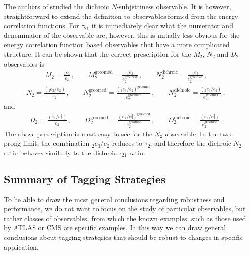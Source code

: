 \documentclass[11pt,letterpaper]{article}
\newcommand{\groomed}{\text{groomed}}
\newcommand{\ecfnobeta}[1]{e_{#1}}
\newcommand{\ecfvarnobeta}[2]{{_{#1}e_{#2}}}
\begin{document}
The authors of \cite{Salam:2016yht} studied the dichroic $N$-subjettiness observable. It is however, straightforward to extend the definition to observables formed from the energy correlation functions. For $\tau_{21}$ it is immediately clear what the numerator and denominator of the observable are, however, this is initially less obvious for the energy correlation function based observables that have a more complicated structure. It can be shown that the correct prescription for the $M_2$, $N_2$ and $D_2$ observables is
\begin{align}
M_2= \frac{ \ecfvarnobeta{1}{3}  }{\ecfnobeta{2}}\,, \qquad  M_2^{\text{groomed}}= \frac{ \ecfvarnobeta{1}{3}  }{\ecfnobeta{2}^\groomed}\,, \qquad  N_2^{\text{dichroic}}= \frac{\ecfvarnobeta{1}{3}  }{\ecfnobeta{2}^\groomed}\,, 
\end{align}
\begin{align}
N_2= \frac{\left( \ecfvarnobeta{2}{3} / \ecfnobeta{2} \right) }{\ecfnobeta{2}}\,, \qquad  N_2^{\text{groomed}}= \frac{\left( \ecfvarnobeta{2}{3} / \ecfnobeta{2} \right)^\groomed }{\ecfnobeta{2}^\groomed}\,, \qquad  N_2^{\text{dichroic}}= \frac{\left( \ecfvarnobeta{2}{3} / \ecfnobeta{2} \right) }{\ecfnobeta{2}^\groomed}\,, 
\end{align}
and
\begin{align}
D_2=\frac{\left( \ecfnobeta{3} / \ecfnobeta{2}^2 \right)}{ \ecfnobeta{2}}\,, \qquad D_2^{\text{groomed}}=\frac{\left( \ecfnobeta{3} / \ecfnobeta{2}^2 \right)^\groomed}{ \ecfnobeta{2}^\groomed}\,, \qquad D_2^{\text{dichroic}}=\frac{\left( \ecfnobeta{3} / \ecfnobeta{2}^2 \right)}{ \ecfnobeta{2}^\groomed}\,.
\end{align}
The above prescription is most easy to see for the $N_2$ observable. In the two-prong limit, the combination $ \ecfvarnobeta{2}{3} / \ecfnobeta{2} $ reduces to $\tau_2$, and therefore the dichroic $N_2$ ratio behaves similarly to the dichroic $\tau_{21}$ ratio.

\subsection{Summary of Tagging Strategies}\label{sec:dichroic_sum}

To be able to draw the most general conclusions regarding robustness and performance, we do not want to focus on the study of particular observables, but rather classes of observables, from which the known examples, such as those used by ATLAS or CMS are specific examples. In this way we can draw general conclusions about tagging strategies that should be robust to changes in specific application.
\end{document}
